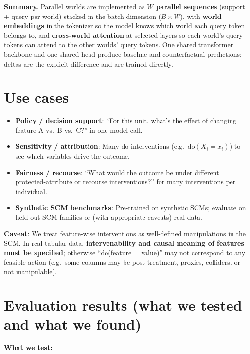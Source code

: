 \documentclass[12pt]{article}
\begin{document}
\textbf{Summary.} Parallel worlds are implemented as \textbf{$W$ parallel sequences} (support + query per world) stacked in the batch dimension ($B \times W$), with \textbf{world embeddings} in the tokenizer so the model knows which world each query token belongs to, and \textbf{cross-world attention} at selected layers so each world's query tokens can attend to the other worlds' query tokens. One shared transformer backbone and one shared head produce baseline and counterfactual predictions; deltas are the explicit difference and are trained directly.

\section{Use cases}

\begin{itemize}
    \item \textbf{Policy / decision support}: ``For this unit, what's the effect of changing feature A vs.\ B vs.\ C?'' in one model call.
    \item \textbf{Sensitivity / attribution}: Many do-interventions (e.g.\ $\text{do}(X_i = x_i)$) to see which variables drive the outcome.
    \item \textbf{Fairness / recourse}: ``What would the outcome be under different protected-attribute or recourse interventions?'' for many interventions per individual.
    \item \textbf{Synthetic SCM benchmarks}: Pre-trained on synthetic SCMs; evaluate on held-out SCM families or (with appropriate caveats) real data.
\end{itemize}

\textbf{Caveat}: We treat feature-wise interventions as well-defined manipulations in the SCM. In real tabular data, \textbf{intervenability and causal meaning of features must be specified}; otherwise ``do(feature = value)'' may not correspond to any feasible action (e.g.\ some columns may be post-treatment, proxies, colliders, or not manipulable).

\section{Evaluation results (what we tested and what we found)}

\textbf{What we test:}
\end{document}
